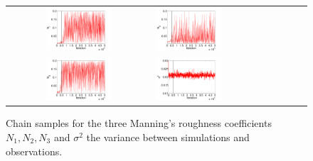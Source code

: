 \begin{figure}[h]
\begin{tabular}{clc}
\includegraphics[width=0.475\textwidth]{./figures/chain_p1.pdf} &
\includegraphics[width=0.475\textwidth]{./figures/chain_p2.pdf} \\
\includegraphics[width=0.475\textwidth]{./figures/chain_p3.pdf} &
\includegraphics[width=0.475\textwidth]{./figures/chain_s1.pdf}
\end{tabular}
\caption{Chain samples for the three Manning's roughness coefficients $N_1,N_2,N_3$ and $\sigma^2$
the variance between simulations and observations.}
\label{fig:mcmc} 
\end{figure}
